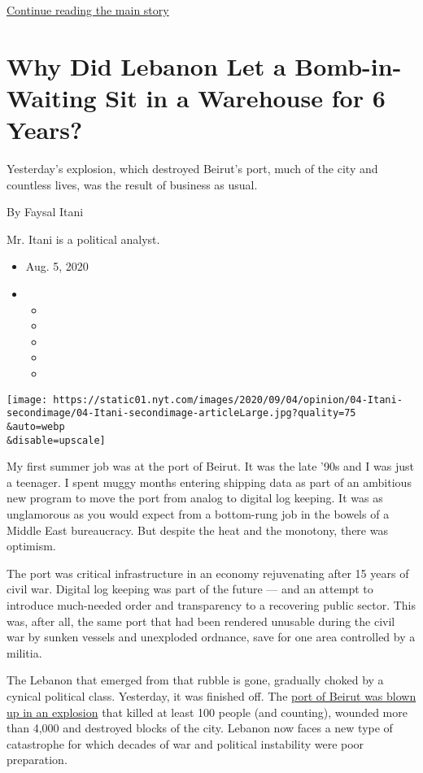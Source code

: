 \protect\hyperlink{after-sponsor}{Continue reading the main story}

\hypertarget{why-did-lebanon-let-a-bomb-in-waiting-sit-in-a-warehouse-for-6-years}{%
\section{Why Did Lebanon Let a Bomb-in-Waiting Sit in a Warehouse for 6
Years?}\label{why-did-lebanon-let-a-bomb-in-waiting-sit-in-a-warehouse-for-6-years}}

Yesterday's explosion, which destroyed Beirut's port, much of the city
and countless lives, was the result of business as usual.

By Faysal Itani

Mr. Itani is a political analyst.

\begin{itemize}
\item
  Aug. 5, 2020
\item
  \begin{itemize}
  \item
  \item
  \item
  \item
  \item
  \end{itemize}
\end{itemize}

\texttt{[image: https://static01.nyt.com/images/2020/09/04/opinion/04-Itani-secondimage/04-Itani-secondimage-articleLarge.jpg?quality=75\\\&auto=webp\\\&disable=upscale]}

My first summer job was at the port of Beirut. It was the late '90s and
I was just a teenager. I spent muggy months entering shipping data as
part of an ambitious new program to move the port from analog to digital
log keeping. It was as unglamorous as you would expect from a
bottom-rung job in the bowels of a Middle East bureaucracy. But despite
the heat and the monotony, there was optimism.

The port was critical infrastructure in an economy rejuvenating after 15
years of civil war. Digital log keeping was part of the future --- and
an attempt to introduce much-needed order and transparency to a
recovering public sector. This was, after all, the same port that had
been rendered unusable during the civil war by sunken vessels and
unexploded ordnance, save for one area controlled by a militia.

The Lebanon that emerged from that rubble is gone, gradually choked by a
cynical political class. Yesterday, it was finished off. The
\href{https://www.nytimes.com/2020/08/05/world/middleeast/beirut-explosion.html}{port
of Beirut was blown up in an explosion} that killed at least 100 people
(and counting), wounded more than 4,000 and destroyed blocks of the
city. Lebanon now faces a new type of catastrophe for which decades of
war and political instability were poor preparation.

